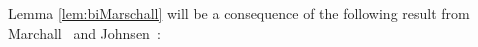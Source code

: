 \documentclass[final,letterpaper,12pt,oneside]{class_diss}
\newtheorem{lem}[thm]{Lemma} %
\theoremstyle{remark}
\newcommand{\re}{\mathbb{R}}
\newcommand{\ent}{\mathbb{Z}}
\newcommand{\rn}{{{\mathbb R}^n}}
\newcommand{\rtn}{\re^{2n}}
\newcommand{\abs}[1]{\left\vert #1 \right\vert}
\newcommand{\norm}[2]{\left\|#1\right\|_{#2}}
\newcommand{\supp}{{\rm{supp}}}
\begin{document}

Lemma \ref{lem:biMarschall} will be a consequence of the following result from Marchall~\cite[p.118, Proposition 5(a)]{MR1376592} and  Johnsen~\cite[p.275, Proposition 4.1]{MR2163627}:

\end{document}
